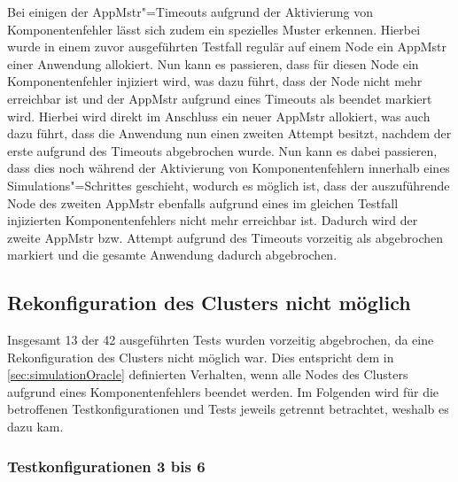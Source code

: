 Bei einigen der \ac{AppMstr}"=Timeouts aufgrund der Aktivierung von Komponentenfehler lässt sich zudem ein spezielles Muster erkennen.
Hierbei wurde in einem zuvor ausgeführten Testfall regulär auf einem Node ein \ac{AppMstr} einer Anwendung allokiert.
Nun kann es passieren, dass für diesen Node ein Komponentenfehler injiziert wird, was dazu führt, dass der Node nicht mehr erreichbar ist und der \ac{AppMstr} aufgrund eines Timeouts als beendet markiert wird.
Hierbei wird direkt im Anschluss ein neuer \ac{AppMstr} allokiert, was auch dazu führt, dass die Anwendung nun einen zweiten Attempt besitzt, nachdem der erste aufgrund des Timeouts abgebrochen wurde.
Nun kann es dabei passieren, dass dies noch während der Aktivierung von Komponentenfehlern innerhalb eines Simulations"=Schrittes geschieht, wodurch es möglich ist, dass der auszuführende Node des zweiten \ac{AppMstr} ebenfalls aufgrund eines im gleichen Testfall injizierten Komponentenfehlers nicht mehr erreichbar ist.
Dadurch wird der zweite \ac{AppMstr} bzw. Attempt aufgrund des Timeouts vorzeitig als abgebrochen markiert und die gesamte Anwendung dadurch abgebrochen.

\subsection{Rekonfiguration des Clusters nicht möglich}
\label{sec:noReconfig}

Insgesamt 13 der 42 ausgeführten Tests wurden vorzeitig abgebrochen, da eine Rekonfiguration des Clusters nicht möglich war.
Dies entspricht dem in \autoref{sec:simulationOracle} definierten Verhalten, wenn alle Nodes des Clusters aufgrund eines Komponentenfehlers beendet werden.
Im Folgenden wird für die betroffenen Testkonfigurationen und Tests jeweils getrennt betrachtet, weshalb es dazu kam.

\subsubsection{Testkonfigurationen 3 bis 6}
\label{sec:noReconf36}

